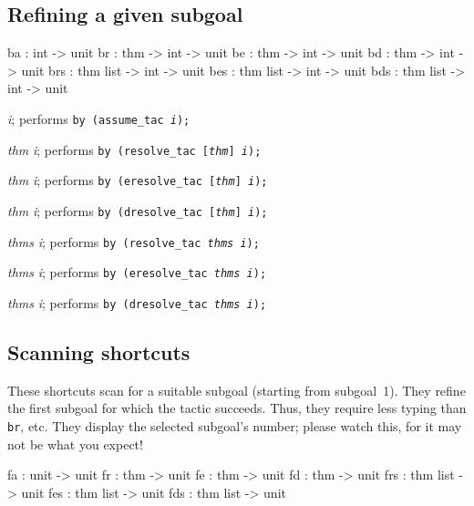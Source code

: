 \subsection{Refining a given subgoal}
\begin{ttbox} 
ba  :             int -> unit
br  : thm      -> int -> unit
be  : thm      -> int -> unit
bd  : thm      -> int -> unit
brs : thm list -> int -> unit
bes : thm list -> int -> unit
bds : thm list -> int -> unit
\end{ttbox}

\begin{ttdescription}
\item[\ttindexbold{ba} {\it i};] 
performs \hbox{\tt by (assume_tac {\it i});}

\item[\ttindexbold{br} {\it thm} {\it i};] 
performs \hbox{\tt by (resolve_tac [{\it thm}] {\it i});}

\item[\ttindexbold{be} {\it thm} {\it i};] 
performs \hbox{\tt by (eresolve_tac [{\it thm}] {\it i});}

\item[\ttindexbold{bd} {\it thm} {\it i};] 
performs \hbox{\tt by (dresolve_tac [{\it thm}] {\it i});}

\item[\ttindexbold{brs} {\it thms} {\it i};] 
performs \hbox{\tt by (resolve_tac {\it thms} {\it i});}

\item[\ttindexbold{bes} {\it thms} {\it i};] 
performs \hbox{\tt by (eresolve_tac {\it thms} {\it i});}

\item[\ttindexbold{bds} {\it thms} {\it i};] 
performs \hbox{\tt by (dresolve_tac {\it thms} {\it i});}
\end{ttdescription}


\subsection{Scanning shortcuts}
These shortcuts scan for a suitable subgoal (starting from subgoal~1).
They refine the first subgoal for which the tactic succeeds.  Thus, they
require less typing than {\tt br}, etc.  They display the selected
subgoal's number; please watch this, for it may not be what you expect!

\begin{ttbox} 
fa  : unit     -> unit
fr  : thm      -> unit
fe  : thm      -> unit
fd  : thm      -> unit
frs : thm list -> unit
fes : thm list -> unit
fds : thm list -> unit
\end{ttbox}

